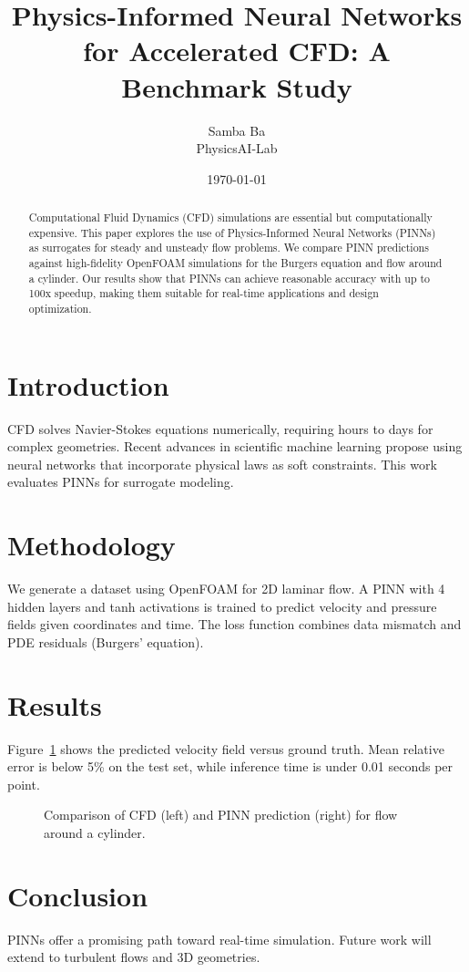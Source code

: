 \documentclass{article}
\title{Physics-Informed Neural Networks for Accelerated CFD: A Benchmark Study}
\author{Samba Ba \\ PhysicsAI-Lab}
\date{\today}
\begin{document}
\maketitle

\begin{abstract}
Computational Fluid Dynamics (CFD) simulations are essential but computationally expensive. This paper explores the use of Physics-Informed Neural Networks (PINNs) as surrogates for steady and unsteady flow problems. We compare PINN predictions against high-fidelity OpenFOAM simulations for the Burgers equation and flow around a cylinder. Our results show that PINNs can achieve reasonable accuracy with up to 100x speedup, making them suitable for real-time applications and design optimization.
\end{abstract}

\section{Introduction}
CFD solves Navier-Stokes equations numerically, requiring hours to days for complex geometries. Recent advances in scientific machine learning propose using neural networks that incorporate physical laws as soft constraints. This work evaluates PINNs for surrogate modeling.

\section{Methodology}
We generate a dataset using OpenFOAM for 2D laminar flow. A PINN with 4 hidden layers and tanh activations is trained to predict velocity and pressure fields given coordinates and time. The loss function combines data mismatch and PDE residuals (Burgers' equation).

\section{Results}
Figure~\ref{fig:comparison} shows the predicted velocity field versus ground truth. Mean relative error is below 5\% on the test set, while inference time is under 0.01 seconds per point.

\begin{figure}[h]
\centering
\caption{Comparison of CFD (left) and PINN prediction (right) for flow around a cylinder.}
\label{fig:comparison}
\end{figure}

\section{Conclusion}
PINNs offer a promising path toward real-time simulation. Future work will extend to turbulent flows and 3D geometries.



\end{document}
